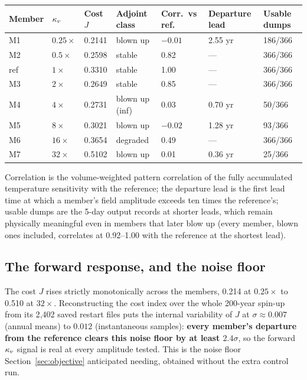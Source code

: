 \begin{center}
\begin{tabularx}{\textwidth}{@{}lY{0.7}Y{0.8}Y{1.2}Y{1.1}Y{1.2}Y{1.0}@{}}
\toprule
\textbf{Member} & \textbf{$\kappa_{v}$} & \textbf{Cost $J$} & \textbf{Adjoint class}
 & \textbf{Corr.\ vs ref.} & \textbf{Departure lead} & \textbf{Usable dumps}\\
\midrule
M1 & $0.25\times$ & 0.2141 & blown up        & $-0.01$ & 2.55 yr & 186/366\\
M2 & $0.5\times$  & 0.2598 & stable          & 0.82    & ---     & 366/366\\
ref & $1\times$   & 0.3310 & stable          & 1.00    & ---     & 366/366\\
M3 & $2\times$    & 0.2649 & stable          & 0.85    & ---     & 366/366\\
M4 & $4\times$    & 0.2731 & blown up (inf)  & 0.03    & 0.70 yr & 50/366\\
M5 & $8\times$    & 0.3021 & blown up        & $-0.02$ & 1.28 yr & 93/366\\
M6 & $16\times$   & 0.3654 & degraded        & 0.49    & ---     & 366/366\\
M7 & $32\times$   & 0.5102 & blown up        & 0.01    & 0.36 yr & 25/366\\
\bottomrule
\end{tabularx}
\end{center}

\noindent
Correlation is the volume-weighted pattern correlation of the fully accumulated
temperature sensitivity with the reference; the departure lead is the first
lead time at which a member's field amplitude exceeds ten times the
reference's; usable dumps are the 5-day output records at shorter leads, which
remain physically meaningful even in members that later blow up (every member,
blown ones included, correlates at 0.92--1.00 with the reference at the
shortest lead).

\subsection{The forward response, and the noise floor}
\label{sec:results-forward}

The cost $J$ rises strictly monotonically across the members, 0.214 at
$0.25\times$ to 0.510 at $32\times$. Reconstructing the cost index over the
whole 200-year spin-up from its 2{,}402 saved restart files puts the internal
variability of $J$ at $\sigma\approx0.007$ (annual means) to $0.012$
(instantaneous samples): \textbf{every member's departure from the reference
clears this noise floor by at least $2.4\sigma$}, so the forward $\kappa_{v}$ signal
is real at every amplitude tested. This is the noise floor
Section~\ref{sec:objective} anticipated needing, obtained without the extra
control run.

